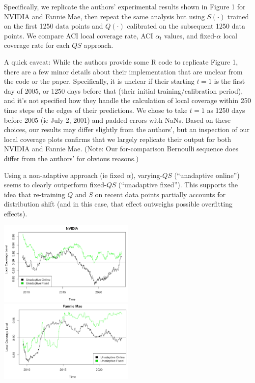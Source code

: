 \documentclass[
]{article}
\begin{document}
Specifically, we replicate the authors' experimental results shown in
Figure 1 for NVIDIA and Fannie Mae, then repeat the same analysis but
using \(S(\cdot)\) trained on the first 1250 data points and
\(Q(\cdot)\) calibrated on the subsequent 1250 data points. We compare
ACI local coverage rate, ACI \(\alpha_t\) values, and fixed-\(\alpha\)
local coverage rate for each \(QS\) approach.

A quick caveat: While the authors provide some R code to replicate
Figure 1, there are a few minor details about their implementation that
are unclear from the code or the paper. Specifically, it is unclear if
their starting \(t=1\) is the first day of 2005, or 1250 days before
that (their initial training/calibration period), and it's not specified
how they handle the calculation of local coverage within 250 time steps
of the edges of their predictions. We chose to take \(t=1\) as 1250 days
before 2005 (ie July 2, 2001) and padded errors with NaNs. Based on
these choices, our results may differ slightly from the authors', but an
inspection of our local coverage plots confirms that we largely
replicate their output for both NVIDIA and Fannie Mae. (Note: Our
for-comparison Bernoulli sequence does differ from the authors' for
obvious reasons.)

Using a non-adaptive approach (ie fixed \(\alpha\)), varying-\(QS\)
(``unadaptive online'') seems to clearly outperform fixed-\(QS\)
(``unadaptive fixed''). This supports the idea that re-training \(Q\)
and \(S\) on recent data points partially accounts for distribution
shift (and in this case, that effect outweighs possible overfitting
effects).

\includegraphics[width=0.5\textwidth,height=\textheight]{./images/3nvidiaqs.png}
\includegraphics[width=0.5\textwidth,height=\textheight]{./images/4fmqs.png}
\end{document}
